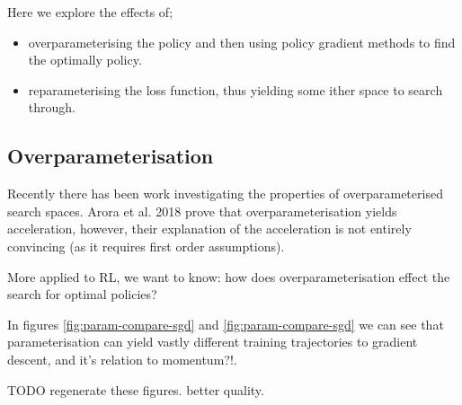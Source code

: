 Here we explore the effects of;
\begin{itemize}
\tightlist
  \item overparameterising the policy and then using policy gradient methods to find the optimally policy.
  \item reparameterising the loss function, thus yielding some ither space to search through.
\end{itemize}




\subsection{Overparameterisation}

Recently there has been work investigating the properties of overparameterised search spaces.
Arora et al. 2018 \cite{Arora2018} prove that overparameterisation yields acceleration, however,
their explanation of the acceleration is not entirely convincing (as it requires first order assumptions).

More applied to RL, we want to know: how does overparameterisation effect the search for optimal policies?

In figures \ref{fig:param-compare-sgd} and \ref{fig:param-compare-sgd} we can see that
parameterisation can yield vastly different training trajectories to gradient descent,
{\color{red}and it's relation to momentum?!}\footnotemark[33].


{\color{red}TODO regenerate these figures. better quality.}

